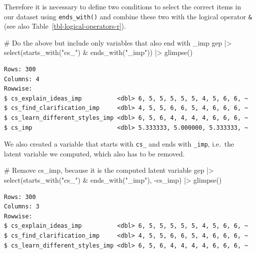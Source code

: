 \documentclass[
  letterpaper,
]{krantz}
\makeatletter
\newenvironment{Shaded}{\begin{snugshade}}{\end{snugshade}}
\newcommand{\CommentTok}[1]{\textcolor[rgb]{0.37,0.37,0.37}{#1}}
\newcommand{\FunctionTok}[1]{\textcolor[rgb]{0.28,0.35,0.67}{#1}}
\newcommand{\NormalTok}[1]{\textcolor[rgb]{0.00,0.23,0.31}{#1}}
\newcommand{\SpecialCharTok}[1]{\textcolor[rgb]{0.37,0.37,0.37}{#1}}
\newcommand{\StringTok}[1]{\textcolor[rgb]{0.13,0.47,0.30}{#1}}
\newenvironment{kframe}{%
\medskip{}
\setlength{\fboxsep}{.8em}
 \def\at@end@of@kframe{}%
 \ifinner\ifhmode%
  \def\at@end@of@kframe{\end{minipage}}%
  \begin{minipage}{\columnwidth}%
 \fi\fi%
 \def\FrameCommand##1{\hskip\@totalleftmargin \hskip-\fboxsep
 \colorbox{shadecolor}{##1}\hskip-\fboxsep
     \hskip-\linewidth \hskip-\@totalleftmargin \hskip\columnwidth}%
 \MakeFramed {\advance\hsize-\width
   \@totalleftmargin\z@ \linewidth\hsize
   \@setminipage}}%
 {\par\unskip\endMakeFramed%
 \at@end@of@kframe}
\renewenvironment{Shaded}{\begin{kframe}}{\end{kframe}}
\makeatother
\begin{document}
Therefore it is necessary to define two conditions to select the correct
items in our dataset using \texttt{ends\_with()} and combine these two
with the logical operator \texttt{\&} (see also
Table~\ref{tbl-logical-operators-r}).

\begin{Shaded}
\begin{Highlighting}[]
\CommentTok{\# Do the above but include only variables that also end with \textquotesingle{}\_imp\textquotesingle{}}
\NormalTok{gep }\SpecialCharTok{|\textgreater{}}
  \FunctionTok{select}\NormalTok{(}\FunctionTok{starts\_with}\NormalTok{(}\StringTok{"cs\_"}\NormalTok{) }\SpecialCharTok{\&} \FunctionTok{ends\_with}\NormalTok{(}\StringTok{"\_imp"}\NormalTok{)) }\SpecialCharTok{|\textgreater{}}
  \FunctionTok{glimpse}\NormalTok{()}
\end{Highlighting}
\end{Shaded}

\begin{verbatim}
Rows: 300
Columns: 4
Rowwise: 
$ cs_explain_ideas_imp          <dbl> 6, 5, 5, 5, 5, 5, 4, 5, 6, 6, ~
$ cs_find_clarification_imp     <dbl> 4, 5, 5, 6, 6, 5, 4, 6, 6, 6, ~
$ cs_learn_different_styles_imp <dbl> 6, 5, 6, 4, 4, 4, 4, 6, 6, 6, ~
$ cs_imp                        <dbl> 5.333333, 5.000000, 5.333333, ~
\end{verbatim}

We also created a variable that starts with \texttt{cs\_} and ends with
\texttt{\_imp}, i.e.~the latent variable we computed, which also has to
be removed.

\begin{Shaded}
\begin{Highlighting}[]
\CommentTok{\# Remove \textquotesingle{}cs\_imp\textquotesingle{}, because it is the computed latent variable}
\NormalTok{gep }\SpecialCharTok{|\textgreater{}}
  \FunctionTok{select}\NormalTok{(}\FunctionTok{starts\_with}\NormalTok{(}\StringTok{"cs\_"}\NormalTok{) }\SpecialCharTok{\&} \FunctionTok{ends\_with}\NormalTok{(}\StringTok{"\_imp"}\NormalTok{), }\SpecialCharTok{{-}}\NormalTok{cs\_imp) }\SpecialCharTok{|\textgreater{}}
  \FunctionTok{glimpse}\NormalTok{()}
\end{Highlighting}
\end{Shaded}

\begin{verbatim}
Rows: 300
Columns: 3
Rowwise: 
$ cs_explain_ideas_imp          <dbl> 6, 5, 5, 5, 5, 5, 4, 5, 6, 6, ~
$ cs_find_clarification_imp     <dbl> 4, 5, 5, 6, 6, 5, 4, 6, 6, 6, ~
$ cs_learn_different_styles_imp <dbl> 6, 5, 6, 4, 4, 4, 4, 6, 6, 6, ~
\end{verbatim}
\end{document}
